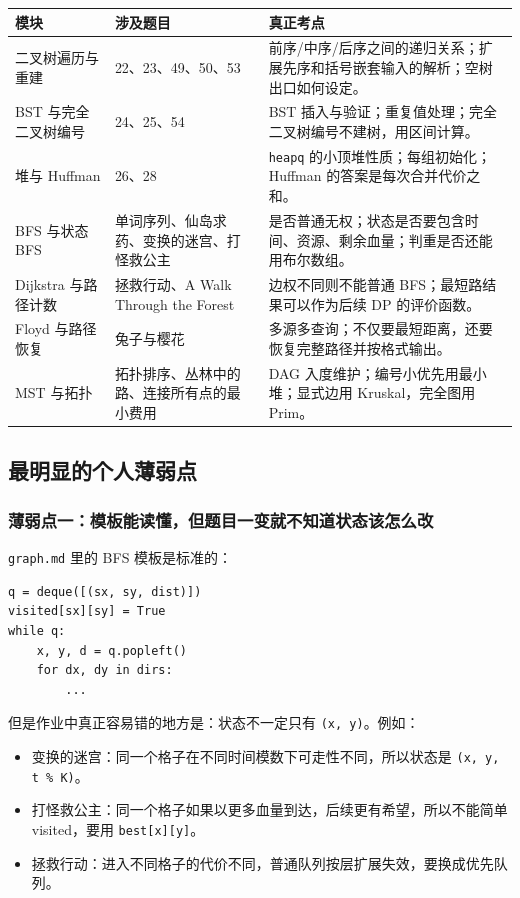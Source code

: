 \documentclass[10pt,a4paper,fontset=none]{ctexart}
\begin{document}
\begin{longtable}{L{2.9cm}L{4.2cm}L{7.2cm}}
\toprule
\textbf{模块} & \textbf{涉及题目} & \textbf{真正考点} \\
\midrule
二叉树遍历与重建 & 22、23、49、50、53 & 前序/中序/后序之间的递归关系；扩展先序和括号嵌套输入的解析；空树出口如何设定。\\
BST 与完全二叉树编号 & 24、25、54 & BST 插入与验证；重复值处理；完全二叉树编号不建树，用区间计算。\\
堆与 Huffman & 26、28 & \texttt{heapq} 的小顶堆性质；每组初始化；Huffman 的答案是每次合并代价之和。\\
BFS 与状态 BFS & 单词序列、仙岛求药、变换的迷宫、打怪救公主 & 是否普通无权；状态是否要包含时间、资源、剩余血量；判重是否还能用布尔数组。\\
Dijkstra 与路径计数 & 拯救行动、A Walk Through the Forest & 边权不同则不能普通 BFS；最短路结果可以作为后续 DP 的评价函数。\\
Floyd 与路径恢复 & 兔子与樱花 & 多源多查询；不仅要最短距离，还要恢复完整路径并按格式输出。\\
MST 与拓扑 & 拓扑排序、丛林中的路、连接所有点的最小费用 & DAG 入度维护；编号小优先用最小堆；显式边用 Kruskal，完全图用 Prim。\\
\bottomrule
\end{longtable}

\subsection{最明显的个人薄弱点}

\subsubsection{薄弱点一：模板能读懂，但题目一变就不知道状态该怎么改}
\texttt{graph.md} 里的 BFS 模板是标准的：
\begin{lstlisting}[style=py]
q = deque([(sx, sy, dist)])
visited[sx][sy] = True
while q:
    x, y, d = q.popleft()
    for dx, dy in dirs:
        ...
\end{lstlisting}
但是作业中真正容易错的地方是：状态不一定只有 \texttt{(x, y)}。例如：
\begin{itemize}
  \item 变换的迷宫：同一个格子在不同时间模数下可走性不同，所以状态是 \texttt{(x, y, t \% K)}。
  \item 打怪救公主：同一个格子如果以更多血量到达，后续更有希望，所以不能简单 visited，要用 \texttt{best[x][y]}。
  \item 拯救行动：进入不同格子的代价不同，普通队列按层扩展失效，要换成优先队列。
\end{itemize}
\end{document}
